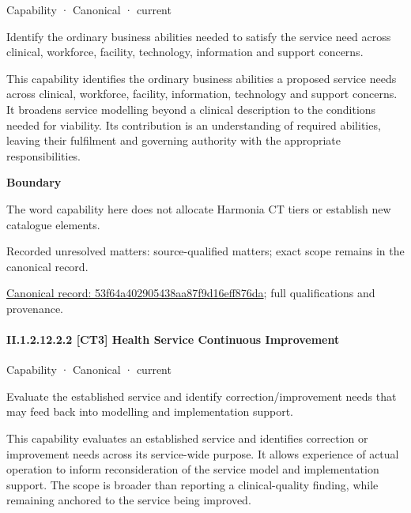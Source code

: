 \label{element:53f64a402905438aa87f9d16eff876da}
{\small Capability · Canonical · current}\par

Identify the ordinary business abilities needed to satisfy the service need across clinical, workforce, facility, technology, information and support concerns.



This capability identifies the ordinary business abilities a proposed service needs across clinical, workforce, facility, information, technology and support concerns. It broadens service modelling beyond a clinical description to the conditions needed for viability. Its contribution is an understanding of required abilities, leaving their fulfilment and governing authority with the appropriate responsibilities.



\textbf{Boundary}



The word capability here does not allocate Harmonia CT tiers or establish new catalogue elements.


{\small Recorded unresolved matters: source-qualified matters; exact scope remains in the canonical record.}\par
{\footnotesize \href{../../../../../../../continuum/strategy/capability/53f64a402905438aa87f9d16eff876da.md}{Canonical record: 53f64a402905438aa87f9d16eff876da}; full qualifications and provenance.}\par
\paragraph*{II.1.2.12.2.2 [CT3] Health Service Continuous Improvement}
\label{navigation:II.1.2.12.2.2}

\label{element:b2b2b91b1a094ef1b13ce6870ff9716f}
{\small Capability · Canonical · current}\par

Evaluate the established service and identify correction/improvement needs that may feed back into modelling and implementation support.



This capability evaluates an established service and identifies correction or improvement needs across its service-wide purpose. It allows experience of actual operation to inform reconsideration of the service model and implementation support. The scope is broader than reporting a clinical-quality finding, while remaining anchored to the service being improved.



